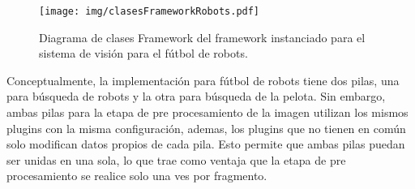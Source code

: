 \begin{figure}[h]

	\texttt{[image: img/clasesFrameworkRobots.pdf]}

	\caption{Diagrama de clases Framework del framework instanciado para el
	sistema de visión para el fútbol de robots.}

\end{figure}

Conceptualmente, la implementación para fútbol de robots tiene dos pilas, una
para búsqueda de robots y la otra para búsqueda de la pelota. Sin embargo, ambas
pilas para la etapa de pre procesamiento de la imagen utilizan los mismos
plugins con la misma configuración, ademas, los plugins que no tienen en común
solo modifican datos propios de cada pila. Esto permite que ambas pilas puedan
ser unidas en una sola, lo que trae como ventaja que la etapa de pre
procesamiento se realice solo una ves por fragmento.
